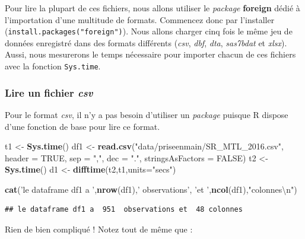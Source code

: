 \documentclass[
  11pt,
  french,
]{book}
\makeatletter
\newenvironment{Shaded}{\begin{snugshade}}{\end{snugshade}}
\newcommand{\CharTok}[1]{\textcolor[rgb]{0.31,0.60,0.02}{#1}}
\newcommand{\DataTypeTok}[1]{\textcolor[rgb]{0.13,0.29,0.53}{#1}}
\newcommand{\KeywordTok}[1]{\textcolor[rgb]{0.13,0.29,0.53}{\textbf{#1}}}
\newcommand{\NormalTok}[1]{#1}
\newcommand{\OtherTok}[1]{\textcolor[rgb]{0.56,0.35,0.01}{#1}}
\newcommand{\StringTok}[1]{\textcolor[rgb]{0.31,0.60,0.02}{#1}}
\newenvironment{kframe}{%
\medskip{}
\setlength{\fboxsep}{.8em}
 \def\at@end@of@kframe{}%
 \ifinner\ifhmode%
  \def\at@end@of@kframe{\end{minipage}}%
  \begin{minipage}{\columnwidth}%
 \fi\fi%
 \def\FrameCommand##1{\hskip\@totalleftmargin \hskip-\fboxsep
 \colorbox{shadecolor}{##1}\hskip-\fboxsep
     \hskip-\linewidth \hskip-\@totalleftmargin \hskip\columnwidth}%
 \MakeFramed {\advance\hsize-\width
   \@totalleftmargin\z@ \linewidth\hsize
   \@setminipage}}%
 {\par\unskip\endMakeFramed%
 \at@end@of@kframe}
\renewenvironment{Shaded}{\begin{kframe}}{\end{kframe}}
\makeatother
\begin{document}
Pour lire la plupart de ces fichiers, nous allons utiliser le \emph{package} \textbf{foreign} dédié à l'importation d'une multitude de formats. Commencez donc par l'installer (\texttt{install.packages("foreign")}). Nous allons charger cinq fois le même jeu de données enregistré dans des formats différents (\emph{csv}, \emph{dbf}, \emph{dta}, \emph{sas7bdat} et \emph{xlsx}). Aussi, nous mesurerons le temps nécessaire pour importer chacun de ces fichiers avec la fonction \texttt{Sys.time}.

\hypertarget{sect01411}{%
\subsubsection{\texorpdfstring{Lire un fichier \emph{csv}}{Lire un fichier csv}}\label{sect01411}}

Pour le format \emph{csv}, il n'y a pas besoin d'utiliser un \emph{package} puisque R dispose d'une fonction de base pour lire ce format.

\begin{Shaded}
\begin{Highlighting}[]
\NormalTok{t1 <-}\StringTok{ }\KeywordTok{Sys.time}\NormalTok{()}
\NormalTok{df1 <-}\StringTok{ }\KeywordTok{read.csv}\NormalTok{(}\StringTok{"data/priseenmain/SR_MTL_2016.csv"}\NormalTok{, }
         \DataTypeTok{header =} \OtherTok{TRUE}\NormalTok{, }\DataTypeTok{sep =} \StringTok{","}\NormalTok{, }\DataTypeTok{dec =} \StringTok{"."}\NormalTok{,}
         \DataTypeTok{stringsAsFactors =} \OtherTok{FALSE}\NormalTok{)}
\NormalTok{t2 <-}\StringTok{ }\KeywordTok{Sys.time}\NormalTok{()}
\NormalTok{d1 <-}\StringTok{ }\KeywordTok{difftime}\NormalTok{(t2,t1,}\DataTypeTok{units=}\StringTok{"secs"}\NormalTok{)}

\KeywordTok{cat}\NormalTok{(}\StringTok{'le dataframe df1 a '}\NormalTok{,}\KeywordTok{nrow}\NormalTok{(df1),}\StringTok{' observations'}\NormalTok{,}
    \StringTok{'et '}\NormalTok{,}\KeywordTok{ncol}\NormalTok{(df1),}\StringTok{"colonnes}\CharTok{\textbackslash{}n}\StringTok{"}\NormalTok{)}
\end{Highlighting}
\end{Shaded}

\begin{verbatim}
## le dataframe df1 a  951  observations et  48 colonnes
\end{verbatim}

Rien de bien compliqué ! Notez tout de même que :
\end{document}
